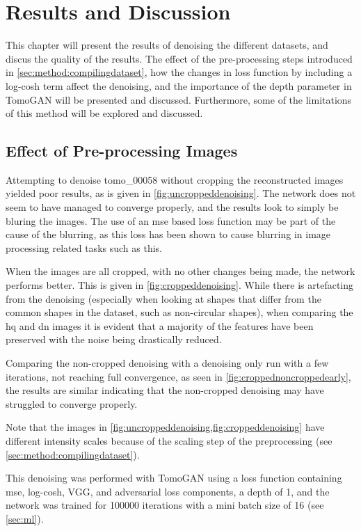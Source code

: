 \chapter{Results and Discussion}
\label{sec:results}
This chapter will present the results of denoising the different datasets, and discus the quality of the results. The effect of the pre-processing steps introduced in \cref{sec:method:compilingdataset}, how the changes in loss function by including a log-cosh term affect the denoising, and the importance of the depth parameter in TomoGAN will be presented and discussed. Furthermore, some of the limitations of this method will be explored and discussed. 

\section{Effect of Pre-processing Images}
Attempting to denoise tomo\_00058 without cropping the reconstructed images yielded poor results, as is given in \cref{fig:uncroppeddenoising}. The network does not seem to have managed to converge properly, and the results look to simply be bluring the images. The use of an \gls{mse} based loss function may be part of the cause of the blurring, as this loss has been shown to cause blurring in image processing related tasks such as this. 

When the images are all cropped, with no other changes being made, the network performs better. This is given in \cref{fig:croppeddenoising}. While there is artefacting from the denoising (especially when looking at shapes that differ from the common shapes in the dataset, such as non-circular shapes), when comparing the \gls{hq} and \gls{dn} images it is evident that a majority of the features have been preserved with the noise being drastically reduced. 

Comparing the non-cropped denoising with a denoising only run with a few iterations, not reaching full convergence, as seen in \cref{fig:croppednoncroppedearly}, the results are similar indicating that the non-cropped denoising may have struggled to converge properly. 

Note that the images in \cref{fig:uncroppeddenoising,fig:croppeddenoising} have different intensity scales because of the scaling step of the preprocessing (see \cref{sec:method:compilingdataset}). 

This denoising was performed with TomoGAN using a loss function containing \gls{mse}, log-cosh, VGG, and adversarial loss components, a depth of 1, and the network was trained for 100000 iterations with a mini batch size of 16 (see \cref{sec:ml}). 

